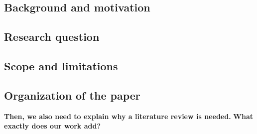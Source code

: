 \subsection{Background and motivation}
\subsection{Research question}
\subsection{Scope and limitations}
\subsection{Organization of the paper}
\textbf{Then, we also need to explain why a literature review is needed.}
\textbf{What exactly does our work add?}
